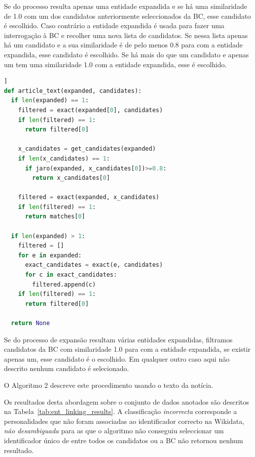 \documentclass[a4paper, twocolumn, 11pt, twoside]{article}
\begin{document}
Se do processo resulta apenas uma entidade expandida e se há uma similaridade de 1.0 com um dos candidatos anteriormente seleccionados da BC, esse candidato é escolhido. Caso contrário a entidade expandida é usada para fazer uma interrogação à BC e recolher uma nova lista de candidatos. Se nessa lista apenas há um candidato e a sua similaridade é de pelo menos 0.8 para com a entidade expandida, esse candidato é escolhido. Se há mais do que um candidato e apenas um tem uma similaridade 1.0 com a entidade expandida, esse é escolhido. 

\begin{lstlisting}[language=python,columns=fullflexible,frame=single,label={lst:alg2},title={Algoritmo 2. Ligação com a Wikidata usando o texto da notícia para expandir as entidades reconhecidas no título.},captionpos=b]]
def article_text(expanded, candidates):
  if len(expanded) == 1:
    filtered = exact(expanded[0], candidates)
	if len(filtered) == 1:
	  return filtered[0]
	  
    x_candidates = get_candidates(expanded)
    if len(x_candidates) == 1:
      if jaro(expanded, x_candidates[0])>=0.8:
        return x_candidates[0]
 
    filtered = exact(expanded, x_candidates)
    if len(filtered) == 1:
      return matches[0]
  
  if len(expanded) > 1:
    filtered = []
    for e in expanded:
      exact_candidates = exact(e, candidates)
	  for c in exact_candidates:
	    filtered.append(c)
    if len(filtered) == 1:
      return filtered[0]

  return None
\end{lstlisting}

Se do processo de expansão resultam várias entidades expandidas, filtramos candidatos da BC com similaridade 1.0 para com a entidade expandida, se existir apenas um, esse candidato é o escolhido. Em qualquer outro caso aqui não descrito nenhum candidato é selecionado.

O Algoritmo 2 descreve este procedimento usando o texto da notícia.

Os resultados desta abordagem sobre o conjunto de dados anotados são descritos na Tabela~\ref{tab:ent_linking_results}. A classificação \textit{incorrecta} corresponde a personalidades que não foram associadas ao identificador correcto na Wikidata, \textit{não desambiguada} para as que o algoritmo não conseguiu seleccionar um identificador único de entre todos os candidatos ou a BC não retornou nenhum resultado.
\end{document}
